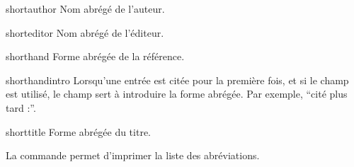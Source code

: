 \begin{choix}
    \item[shortauthor] Nom abrégé de l'auteur.
    \item[shorteditor] Nom abrégé de l'éditeur.
    \item[shorthand] Forme abrégée de la référence.
    \item[shorthandintro] Lorsqu'une entrée est citée pour la première fois, et si le champ  est utilisé, le champ  sert à introduire la forme abrégée. Par exemple, \enquote{cité plus tard :}.
    \item[shorttitle] Forme abrégée du titre.
\end{choix}

La commande  permet d'imprimer la liste des abréviations.

\bibverbosetrad
